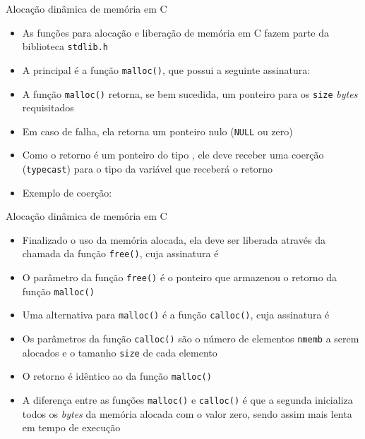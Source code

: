 \begin{frame}[fragile]{Alocação dinâmica de memória em C}

	\begin{itemize}
		\item As funções para alocação e liberação de memória em C fazem parte da biblioteca 
        \texttt{stdlib.h}

		\item A principal é a função \texttt{malloc()}, que possui a seguinte assinatura:

		\item A função \texttt{malloc()} retorna, se bem sucedida, um ponteiro para os 
        \texttt{size} \textit{bytes} requisitados

        \item Em caso de falha, ela retorna um ponteiro nulo (\texttt{NULL} ou zero)

		\item Como o retorno é um ponteiro do tipo , ele 
		deve receber uma coerção (\texttt{typecast}) para o tipo da variável que receberá o 
        retorno

        \item Exemplo de coerção:
	\end{itemize}

\end{frame}

\begin{frame}[fragile]{Alocação dinâmica de memória em C}

	\begin{itemize}
		\item Finalizado o uso da memória alocada, ela deve ser liberada através da chamada da 
        função \texttt{free()}, cuja assinatura é

		\item O parâmetro da função \texttt{free()} é o ponteiro que armazenou o retorno da 
        função \texttt{malloc()}

		\item Uma alternativa para \texttt{malloc()} é a função \texttt{calloc()}, cuja assinatura é

		\item Os parâmetros da função \texttt{calloc()} são o número de elementos 
        \texttt{nmemb} a serem alocados e o tamanho \texttt{size} de cada elemento

        \item O retorno é idêntico ao da função \texttt{malloc()}

		\item A diferença entre as funções \texttt{malloc()} e \texttt{calloc()} é que a segunda 
        inicializa todos os \textit{bytes} da memória alocada com o valor zero, sendo assim mais 
		lenta em tempo de execução
	\end{itemize}

\end{frame}

